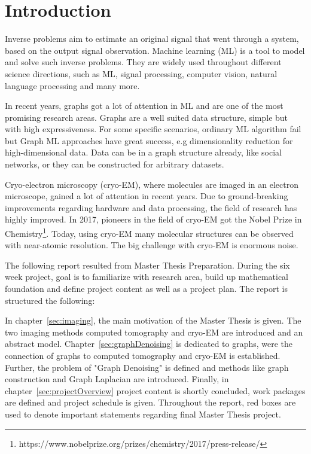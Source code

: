 \chapter{Introduction}
\label{sec:introduction}

Inverse problems aim to estimate an original signal that went through a system, based on the output signal observation.
Machine learning (ML) is a tool to model and solve such inverse problems.
They are widely used throughout different science directions, such as ML,
signal processing, computer vision, natural language processing and many more.

In recent years, graphs got a lot of attention in ML and are one of the most promising research areas.
Graphs are a well suited data structure, simple but with high expressiveness. 
For some specific scenarios, ordinary ML algorithm fail but Graph ML approaches have great success, e.g dimensionality reduction for high-dimensional data.
Data can be in a graph structure already, like social networks, or they can be constructed for arbitrary datasets.


Cryo-electron microscopy (cryo-EM), where molecules are imaged in an electron microscope,
gained a lot of attention in recent years. 
Due to ground-breaking improvements regarding hardware and data processing, the field of research
has highly improved. In 2017, pioneers in the field of cryo-EM got the 
Nobel Prize in Chemistry\footnote{https://www.nobelprize.org/prizes/chemistry/2017/press-release/}.
Today, using cryo-EM many molecular structures can be observed with near-atomic resolution.
The big challenge with cryo-EM is enormous noise. 

\bigskip

The following report resulted from Master Thesis Preparation. During the six week project, 
goal is to familiarize with research area, build up mathematical foundation 
and define project content as well as a project plan.
The report is structured the following:

In chapter~\ref{sec:imaging}, the main motivation of the Master Thesis is given. The two imaging methods
computed tomography and cryo-EM are introduced and an abstract model.
Chapter~\ref{sec:graphDenoising} is dedicated to graphs, were the connection of graphs to computed tomography and 
cryo-EM is established. Further, the problem of "Graph Denoising" is defined and methods like graph
construction and Graph Laplacian are introduced.
Finally, in chapter~\ref{sec:projectOverview} project content is shortly concluded, work packages are defined and project schedule is given.
Throughout the report, red boxes are used to denote important statements
regarding final Master Thesis project.
